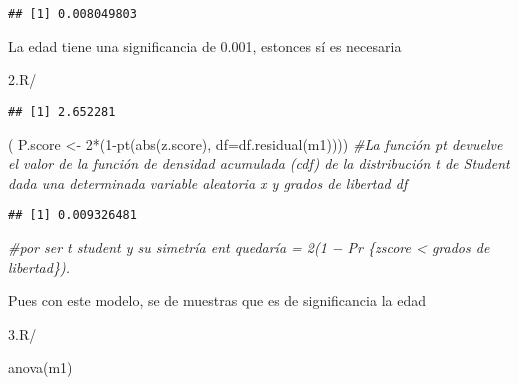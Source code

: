 \documentclass[
]{article}
\newenvironment{Shaded}{\begin{snugshade}}{\end{snugshade}}
\newcommand{\AttributeTok}[1]{\textcolor[rgb]{0.77,0.63,0.00}{#1}}
\newcommand{\CommentTok}[1]{\textcolor[rgb]{0.56,0.35,0.01}{\textit{#1}}}
\newcommand{\DecValTok}[1]{\textcolor[rgb]{0.00,0.00,0.81}{#1}}
\newcommand{\FunctionTok}[1]{\textcolor[rgb]{0.00,0.00,0.00}{#1}}
\newcommand{\NormalTok}[1]{#1}
\newcommand{\OtherTok}[1]{\textcolor[rgb]{0.56,0.35,0.01}{#1}}
\newcommand{\SpecialCharTok}[1]{\textcolor[rgb]{0.00,0.00,0.00}{#1}}
\begin{document}
\begin{verbatim}
## [1] 0.008049803
\end{verbatim}

La edad tiene una significancia de 0.001, estonces sí es necesaria

2.R/

\begin{Shaded}
\end{Shaded}

\begin{verbatim}
## [1] 2.652281
\end{verbatim}

\begin{Shaded}
\begin{Highlighting}[]
\NormalTok{( P.score }\OtherTok{\textless{}{-}} \DecValTok{2}\SpecialCharTok{*}\NormalTok{(}\DecValTok{1}\SpecialCharTok{{-}}\FunctionTok{pt}\NormalTok{(}\FunctionTok{abs}\NormalTok{(z.score), }\AttributeTok{df=}\FunctionTok{df.residual}\NormalTok{(m1)))) }\CommentTok{\#La función pt devuelve el valor de la función de densidad acumulada (cdf) de la distribución t de Student dada una determinada variable aleatoria x y grados de libertad df}
\end{Highlighting}
\end{Shaded}

\begin{verbatim}
## [1] 0.009326481
\end{verbatim}

\begin{Shaded}
\begin{Highlighting}[]
\CommentTok{\#por ser t student y su simetría ent quedaría = 2(1 − Pr \{zscore \textless{} grados de libertad\}).}
\end{Highlighting}
\end{Shaded}

Pues con este modelo, se de muestras que es de significancia la edad

3.R/

\begin{Shaded}
\begin{Highlighting}[]
\FunctionTok{anova}\NormalTok{(m1)}
\end{Highlighting}
\end{Shaded}
\end{document}

